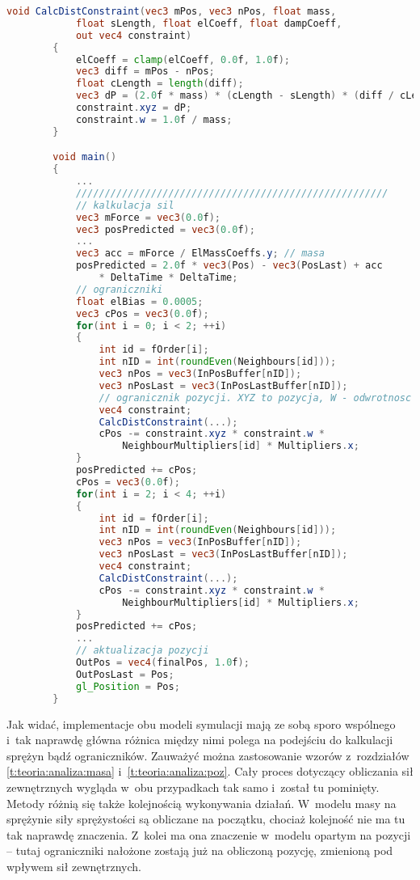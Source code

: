 		\begin{lstlisting}[language=GLSL,caption={Obliczanie przesunięcia -- model oparty na pozycji},label={lst_5_2}]
		void CalcDistConstraint(vec3 mPos, vec3 nPos, float mass, 
			float sLength, float elCoeff, float dampCoeff,
			out vec4 constraint)
		{
			elCoeff = clamp(elCoeff, 0.0f, 1.0f);
			vec3 diff = mPos - nPos;
			float cLength = length(diff);
			vec3 dP = (2.0f * mass) * (cLength - sLength) * (diff / cLength) * elCoeff;
			constraint.xyz = dP;
			constraint.w = 1.0f / mass;
		}

		void main()
		{
			...
			//////////////////////////////////////////////////////
			// kalkulacja sil
			vec3 mForce = vec3(0.0f);
			vec3 posPredicted = vec3(0.0f);
			...
			vec3 acc = mForce / ElMassCoeffs.y;	// masa
			posPredicted = 2.0f * vec3(Pos) - vec3(PosLast) + acc 
				* DeltaTime * DeltaTime;
			// ograniczniki
			float elBias = 0.0005;
			vec3 cPos = vec3(0.0f);
			for(int i = 0; i < 2; ++i)
			{
				int id = fOrder[i];
				int nID = int(roundEven(Neighbours[id]));
				vec3 nPos = vec3(InPosBuffer[nID]);
				vec3 nPosLast = vec3(InPosLastBuffer[nID]);
				// ogranicznik pozycji. XYZ to pozycja, W - odwrotnosc masy
				vec4 constraint;
				CalcDistConstraint(...);
				cPos -= constraint.xyz * constraint.w * 
					NeighbourMultipliers[id] * Multipliers.x;
			}
			posPredicted += cPos;
			cPos = vec3(0.0f);
			for(int i = 2; i < 4; ++i)
			{
				int id = fOrder[i];
				int nID = int(roundEven(Neighbours[id]));
				vec3 nPos = vec3(InPosBuffer[nID]);
				vec3 nPosLast = vec3(InPosLastBuffer[nID]);
				vec4 constraint;
				CalcDistConstraint(...);
				cPos -= constraint.xyz * constraint.w * 
					NeighbourMultipliers[id] * Multipliers.x;
			}
			posPredicted += cPos;
			...
			// aktualizacja pozycji
			OutPos = vec4(finalPos, 1.0f);
			OutPosLast = Pos;
			gl_Position = Pos;
		}	
		\end{lstlisting}

		Jak widać, implementacje obu modeli symulacji mają ze sobą sporo wspólnego i~tak naprawdę główna różnica między nimi polega na podejściu do kalkulacji sprężyn bądź ograniczników. Zauważyć można zastosowanie wzorów z~rozdziałów \ref{t:teoria:analiza:masa} i~\ref{t:teoria:analiza:poz}. Cały proces dotyczący obliczania sił zewnętrznych wygląda w~obu przypadkach tak samo i~został tu pominięty. Metody różnią się także kolejnością wykonywania działań. W~modelu masy na sprężynie siły sprężystości są obliczane na początku, chociaż kolejność nie ma tu tak naprawdę znaczenia. Z~kolei ma ona znaczenie w~modelu opartym na pozycji -- tutaj ograniczniki nałożone zostają już na obliczoną pozycję, zmienioną pod wpływem sił zewnętrznych.
		
